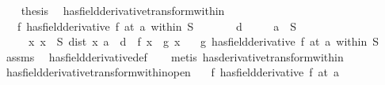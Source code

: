 \begin{isabellebody}
\ \ \isamarkupfalse%
\ {\isacharquery}{\kern0pt}thesis\ \isacommand{{\isachardot}{\kern0pt}}\isamarkupfalse%
\isanewline
{}\isamarkupfalse%
%
\endisatagproof
{\isafoldproof}%
%
\isadelimproof
\isanewline
%
\endisadelimproof
\isanewline
{}\isamarkupfalse%
\ has{\isacharunderscore}{\kern0pt}field{\isacharunderscore}{\kern0pt}derivative{\isacharunderscore}{\kern0pt}transform{\isacharunderscore}{\kern0pt}within{\isacharcolon}{\kern0pt}\isanewline
\ \ \ {\isachardoublequoteopen}{\isacharparenleft}{\kern0pt}f\ has{\isacharunderscore}{\kern0pt}field{\isacharunderscore}{\kern0pt}derivative\ f{\isacharprime}{\kern0pt}{\isacharparenright}{\kern0pt}\ {\isacharparenleft}{\kern0pt}at\ a\ within\ S{\isacharparenright}{\kern0pt}{\isachardoublequoteclose}\isanewline
\ \ \ \ \ {\isachardoublequoteopen}{}\ {\isacharless}{\kern0pt}\ d{\isachardoublequoteclose}\isanewline
\ \ \ \ \ {\isachardoublequoteopen}a\ {\isasymin}\ S{\isachardoublequoteclose}\isanewline
\ \ \ \ \ {\isachardoublequoteopen}{\isasymAnd}x{\isachardot}{\kern0pt}\ {\isasymlbrakk}x\ {\isasymin}\ S{\isacharsemicolon}{\kern0pt}\ dist\ x\ a\ {\isacharless}{\kern0pt}\ d{\isasymrbrakk}\ {\isasymLongrightarrow}\ f\ x\ {\isacharequal}{\kern0pt}\ g\ x{\isachardoublequoteclose}\isanewline
\ \ \ {\isachardoublequoteopen}{\isacharparenleft}{\kern0pt}g\ has{\isacharunderscore}{\kern0pt}field{\isacharunderscore}{\kern0pt}derivative\ f{\isacharprime}{\kern0pt}{\isacharparenright}{\kern0pt}\ {\isacharparenleft}{\kern0pt}at\ a\ within\ S{\isacharparenright}{\kern0pt}{\isachardoublequoteclose}\isanewline
%
\isadelimproof
\ \ %
\endisadelimproof
%
\isatagproof
{}\isamarkupfalse%
\ assms\ \isamarkupfalse%
\ has{\isacharunderscore}{\kern0pt}field{\isacharunderscore}{\kern0pt}derivative{\isacharunderscore}{\kern0pt}def\isanewline
\ \ \isamarkupfalse%
\ {\isacharparenleft}{\kern0pt}metis\ has{\isacharunderscore}{\kern0pt}derivative{\isacharunderscore}{\kern0pt}transform{\isacharunderscore}{\kern0pt}within{\isacharparenright}{\kern0pt}%
\endisatagproof
{\isafoldproof}%
%
\isadelimproof
\isanewline
%
\endisadelimproof
\isanewline
{}\isamarkupfalse%
\ has{\isacharunderscore}{\kern0pt}field{\isacharunderscore}{\kern0pt}derivative{\isacharunderscore}{\kern0pt}transform{\isacharunderscore}{\kern0pt}within{\isacharunderscore}{\kern0pt}open{\isacharcolon}{\kern0pt}\isanewline
\ \ \ {\isachardoublequoteopen}{\isacharparenleft}{\kern0pt}f\ has{\isacharunderscore}{\kern0pt}field{\isacharunderscore}{\kern0pt}derivative\ f{\isacharprime}{\kern0pt}{\isacharparenright}{\kern0pt}\ {\isacharparenleft}{\kern0pt}at\ a{\isacharparenright}{\kern0pt}{\isachardoublequoteclose}\isanewline

\end{isabellebody}
